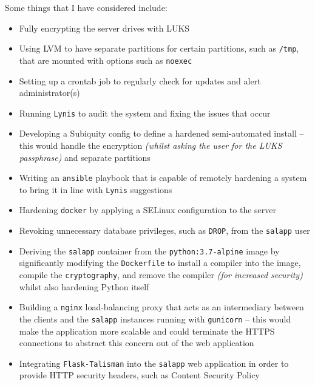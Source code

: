 Some things that I have considered include:
\begin{itemize}
  \item Fully encrypting the server drives with LUKS
  \item Using LVM to have separate partitions for certain partitions, such as \texttt{/tmp}, that are mounted with options such as \texttt{noexec}
  \item Setting up a crontab job to regularly check for updates and alert administrator(s)
  \item Running \texttt{Lynis} to audit the system and fixing the issues that occur
  \item Developing a Subiquity config to define a hardened semi-automated install -- this would handle the encryption \textit{(whilst asking the user for the LUKS passphrase)} and separate partitions
  \item Writing an \texttt{ansible} playbook that is capable of remotely hardening a system to bring it in line with \texttt{Lynis} suggestions
  \item Hardening \texttt{docker} by applying a SELinux configuration to the server
  \item Revoking unnecessary database privileges, such as \texttt{DROP}, from the \texttt{salapp} user
  \item Deriving the \texttt{salapp} container from the \texttt{python:3.7-alpine} image by significantly modifying the \texttt{Dockerfile} to install a compiler into the image, compile the \texttt{cryptography}, and remove the compiler \textit{(for increased security)} whilst also hardening Python itself
  \item Building a \texttt{nginx} load-balancing proxy that acts as an intermediary between the clients and the \texttt{salapp} instances running with \texttt{gunicorn} -- this would make the application more scalable and could terminate the HTTPS connections to abstract this concern out of the web application
  \item Integrating \texttt{Flask-Talisman} into the \texttt{salapp} web application in order to provide HTTP security headers, such as Content Security Policy
\end{itemize}

